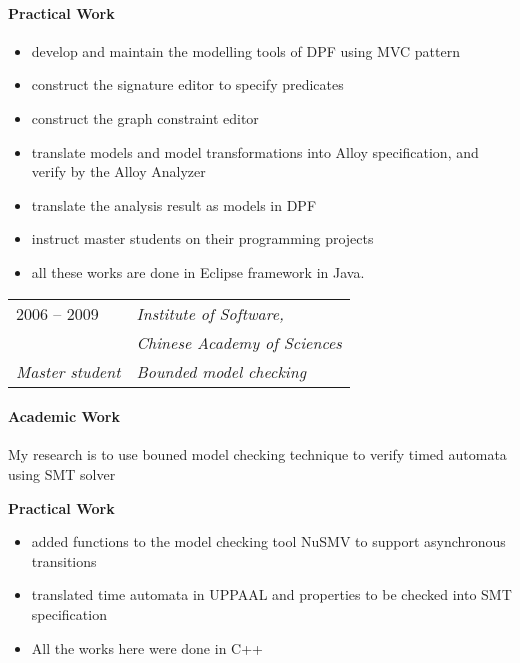 \documentclass[10pt]{article} %
\begin{document}
{\begin{minipage}[t]{0.5\textwidth}
\paragraph{Practical Work}\normalsize
{\begin{itemize}[label={\textcolor{shade}\textbullet}]
        \setlength{\itemsep}{0.1\baselineskip}
    \item develop and maintain the modelling tools of DPF using MVC pattern
    \item construct the signature editor to specify predicates
    \item construct the graph constraint editor
    \item translate models and model transformations into Alloy specification, and verify by the Alloy Analyzer
    \item translate the analysis result as models in DPF
    \item instruct master students on their programming projects
    \item  all these works are done in Eclipse framework in Java.
\end{itemize}}

\begin{tabu}{L{65pt}R{180pt}} %
    
    \rowfont{\color{shade}}
    2006 -- 2009 & \textit{Institute of Software,} \\ 
    \rowfont{\color{shade}}
    \vspace{-1mm} & \vspace{-1mm}\textit{Chinese Academy of Sciences}\\
    \rowfont{\color{shade}}
    \vspace{-1mm} \textit{Master student} &  \vspace{-1mm}\textit{Bounded model checking}
\end{tabu}
\paragraph{Academic Work}\normalsize{My research is to use bouned model checking technique to verify timed automata using SMT solver}

\textbf{Practical Work}\normalsize{
    \begin{itemize}[label={\textcolor{shade}\textbullet}]
        \setlength{\itemsep}{0.1\baselineskip}
        \item added functions to the model checking tool NuSMV to support asynchronous transitions
        \item translated time automata in UPPAAL and properties to be checked into SMT specification
        \item All the works here were done in C++
\end{itemize}}


\end{minipage}}
\end{document}
